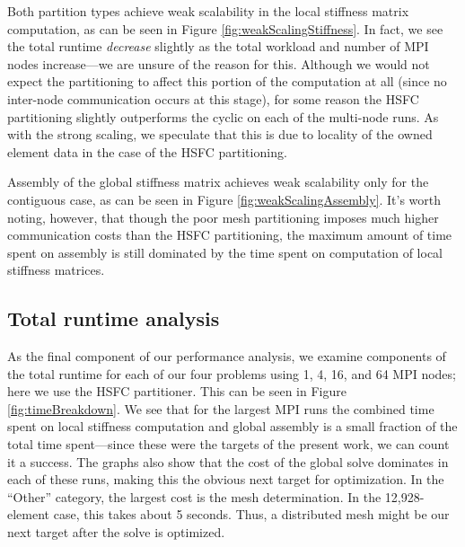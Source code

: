 \documentclass{article}
\begin{document}
Both partition types achieve weak scalability in the local stiffness matrix computation, as can be seen in Figure \ref{fig:weakScalingStiffness}.  In fact, we see the total runtime \emph{decrease} slightly as the total workload and number of MPI nodes increase---we are unsure of the reason for this. Although we would not expect the partitioning to affect this portion of the computation at all (since no inter-node communication occurs at this stage), for some reason the HSFC partitioning slightly outperforms the cyclic on each of the multi-node runs.  As with the strong scaling, we speculate that this is due to locality of the owned element data in the case of the HSFC partitioning.

Assembly of the global stiffness matrix achieves weak scalability only for the contiguous case, as can be seen in Figure \ref{fig:weakScalingAssembly}. It's worth noting, however, that though the poor mesh partitioning imposes much higher communication costs than the HSFC partitioning, the maximum amount of time spent on assembly is still dominated by the time spent on computation of local stiffness matrices.

\subsection{Total runtime analysis}\label{sec:runtimeAnalysis}
As the final component of our performance analysis, we examine components of the total runtime for each of our four problems using 1, 4, 16, and 64 MPI nodes; here we use the HSFC partitioner.  This can be seen in Figure \ref{fig:timeBreakdown}.  We see that for the largest MPI runs the combined time spent on local stiffness computation and global assembly is a small fraction of the total time spent---since these were the targets of the present work, we can count it a success.  The graphs also show that the cost of the global solve dominates in each of these runs, making this the obvious next target for optimization.  In the ``Other'' category, the largest cost is the mesh determination.  In the 12,928-element case, this takes about 5 seconds.  Thus, a distributed mesh might be our next target after the solve is optimized.
\end{document}
